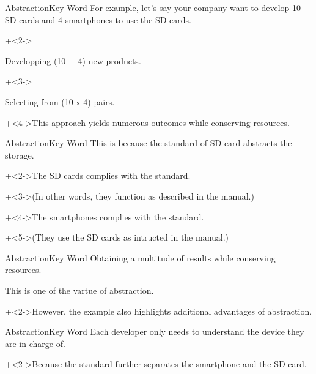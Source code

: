 \begin{frame}[t]{Abstraction}{Key Word}
    For example, let's say your company want to develop 10 SD cards and 4 smartphones to use the SD cards.
    \vspace{4ex}

    \begin{itemize}
        \onslide+<2->{\item[Cost]   Developping (10 + 4) new products.}
        \onslide+<3->{\item[Usage]    Selecting from (10 x 4) pairs.}
    \end{itemize}
    \vspace{4ex}

    \onslide+<4->{This approach yields numerous outcomes while conserving resources.}
\end{frame}


\begin{frame}{Abstraction}{Key Word}
    This is because the standard of SD card abstracts the storage.
    \vspace{4ex}

    \onslide+<2->{The SD cards complies with the standard.}
    \vspace{2ex}

    \onslide+<3->{(In other words, they function as described in the manual.)}
    \vspace{4ex}

    \onslide+<4->{The smartphones complies with the standard.}
    \vspace{2ex}

    \onslide+<5->{(They use the SD cards as intructed in the manual.)}
\end{frame}


\begin{frame}{Abstraction}{Key Word}
    Obtaining a multitude of results while conserving resources.
    \vspace{4ex}

    This is one of the vartue of abstraction.
    \vspace{4ex}

    \onslide+<2->{However, the example also highlights additional advantages of abstraction.}
\end{frame}


\begin{frame}{Abstraction}{Key Word}
    Each developer only needs to understand the device they are in charge of.
    \vspace{4ex}

    \onslide+<2->{Because the standard further separates the smartphone and the SD card.}
\end{frame}


